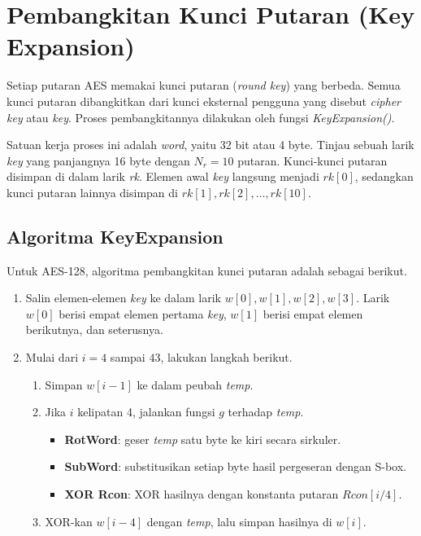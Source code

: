 \section{Pembangkitan Kunci Putaran (Key Expansion)}
\label{sec:key-expansion-aes}

Setiap putaran AES memakai kunci putaran (\textit{round key}) yang berbeda. Semua
kunci putaran dibangkitkan dari kunci eksternal pengguna yang disebut
\textit{cipher key} atau \textit{key}. Proses pembangkitannya dilakukan oleh fungsi
\textit{KeyExpansion()}.

Satuan kerja proses ini adalah \textit{word}, yaitu 32 bit atau 4 byte. Tinjau
sebuah larik \textit{key} yang panjangnya 16 byte dengan $N_r = 10$ putaran.
Kunci-kunci putaran disimpan di dalam larik \textit{rk}. Elemen awal \textit{key}
langsung menjadi $rk[0]$, sedangkan kunci putaran lainnya disimpan di
$rk[1], rk[2], \dots, rk[10]$.

\subsection{Algoritma KeyExpansion}

Untuk AES-128, algoritma pembangkitan kunci putaran adalah sebagai berikut.
\begin{enumerate}
    \item Salin elemen-elemen \textit{key} ke dalam larik $w[0], w[1], w[2], w[3]$.
    Larik $w[0]$ berisi empat elemen pertama \textit{key}, $w[1]$ berisi empat
    elemen berikutnya, dan seterusnya.
    \item Mulai dari $i = 4$ sampai $43$, lakukan langkah berikut.
    \begin{enumerate}
        \item Simpan $w[i-1]$ ke dalam peubah \textit{temp}.
        \item Jika $i$ kelipatan 4, jalankan fungsi $g$ terhadap \textit{temp}.
        \begin{itemize}
            \item \textbf{RotWord}: geser \textit{temp} satu byte ke kiri secara
            sirkuler.
            \item \textbf{SubWord}: substitusikan setiap byte hasil pergeseran
            dengan S-box.
            \item \textbf{XOR Rcon}: XOR hasilnya dengan konstanta putaran
            $Rcon[i/4]$.
        \end{itemize}
        \item XOR-kan $w[i-4]$ dengan \textit{temp}, lalu simpan hasilnya di
        $w[i]$.
    \end{enumerate}
\end{enumerate}

